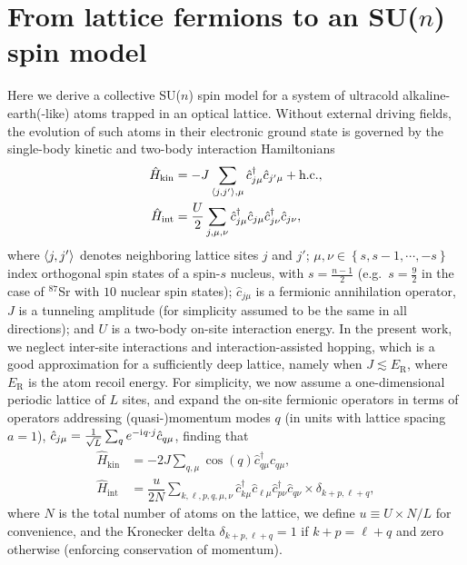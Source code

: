 \documentclass[aps,pra,nofootinbib,twocolumn,superscriptaddress]{revtex4-2}
\renewcommand{\t}{\text} %
\newcommand{\f}[2]{\dfrac{#1}{#2}} %
\newcommand{\p}[1]{\left(#1\right)} %
\renewcommand{\set}[1]{\left\{#1\right\}} %
\newcommand{\bk}{\braket} %
\renewcommand{\i}{\mathrm{i}\mkern1mu} %
\newcommand{\1}{\mathds{1}}
\renewcommand{\c}{\hat{c}}
\renewcommand{\H}{\hat{H}}
\begin{document}
\section{From lattice fermions to an SU($n$) spin model}
\label{sec:spin_model}

Here we derive a collective SU($n$) spin model for a system of ultracold alkaline-earth(-like) atoms trapped in an optical lattice.
Without external driving fields, the evolution of such atoms in their electronic ground state is governed by the single-body kinetic and two-body interaction Hamiltonians
\begin{align}
  \H_{\t{kin}}
  &= -J \sum_{\bk{j,j'},\mu} \c_{j\mu}^\dag \c_{j'\mu} + \t{h.c.},
  \label{eq:H_kin_FH} \\
  \H_{\t{int}}
  &= \f{U}{2} \sum_{j,\mu,\nu}
  \c_{j\mu}^\dag \c_{j\mu} \c_{j\nu}^\dag \c_{j\nu},
  \label{eq:H_int_FH}
\end{align}
where $\bk{j,j'}$ denotes neighboring lattice sites $j$ and $j'$; $\mu,\nu\in\set{s,s-1,\cdots,-s}$ index orthogonal spin states of a spin-$s$ nucleus, with $s=\frac{n-1}{2}$ (e.g.~$s=\frac{9}{2}$ in the case of ${}^{87}$Sr with $10$ nuclear spin states); $\c_{j\mu}$ is a fermionic annihilation operator, $J$ is a tunneling amplitude (for simplicity assumed to be the same in all directions); and $U$ is a two-body on-site interaction energy.
In the present work, we neglect inter-site interactions and interaction-assisted hopping, which is a good approximation for a sufficiently deep lattice, namely when $J\lesssim E_{\t{R}}$, where $E_{\t{R}}$ is the atom recoil energy.
For simplicity, we now assume a one-dimensional periodic lattice of $L$ sites, and expand the on-site fermionic operators in terms of operators addressing (quasi-)momentum modes $q$ (in units with lattice spacing $a=1$), $\c_{j\mu} = \frac1{\sqrt{L}} \sum_q e^{-\i q\cdot j} \c_{q\mu}$, finding that
\begin{align}
  \H_{\t{kin}}
  &= -2J\sum_{q,\mu} \cos\p{q} \c_{q\mu}^\dag \c_{q\mu}, \\
  \H_{\t{int}}
  &= \f{u}{2N} \sum_{k,\ell,p,q,\mu,\nu}
  \c_{k\mu}^\dag \c_{\ell\mu} \c_{p\nu}^\dag \c_{q\nu}
  \times \delta_{k+p,\ell+q},
  \label{eq:H_int_momenta}
\end{align}
where $N$ is the total number of atoms on the lattice, we define $u\equiv U\times N/L$ for convenience, and the Kronecker delta $\delta_{k+p,\ell+q}=1$ if $k+p=\ell+q$ and zero otherwise (enforcing conservation of momentum).
\end{document}
